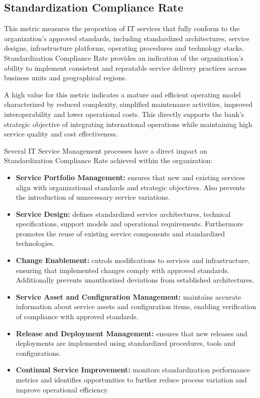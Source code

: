 \subsection{Standardization Compliance Rate}
\label{sub:stdCompliaceRate}

This metric measures the proportion of IT services that fully conform to the organization's approved standards, including standardized architectures, service designs, infrastructure platforms, operating procedures and technology stacks. Standardization Compliance Rate provides an indication of the organization's ability to implement consistent and repeatable service delivery practices across business units and geographical regions.

A high value for this metric indicates a mature and efficient operating model characterized by reduced complexity, simplified maintenance activities, improved interoperability and lower operational costs. This directly supports the bank's strategic objective of integrating international operations while maintaining high service quality and cost effectiveness.

Several IT Service Management processes have a direct impact on Standardization Compliance Rate achieved within the organization:

\begin{itemize}
    \item \textbf{Service Portfolio Management:} ensures that new and existing services align with organizational standards and strategic objectives. Also prevents the introduction of unnecessary service variations.
    \item \textbf{Service Design:} defines standardized service architectures, technical specifications, support models and operational requirements. Furthermore promotes the reuse of existing service components and standardized technologies.
    \item \textbf{Change Enablement:} cntrols modifications to services and infrastructure, ensuring that implemented changes comply with approved standards. Additionally prevents unauthorized deviations from established architectures.
    \item \textbf{Service Asset and Configuration Management:} maintains accurate information about service assets and configuration items, enabling verification of compliance with approved standards.
    \item \textbf{Release and Deployment Management:} ensures that new releases and deployments are implemented using standardized procedures, tools and configurations.
    \item \textbf{Continual Service Improvement:} monitors standardization performance metrics and identifies opportunities to further reduce process variation and improve operational efficiency.
\end{itemize}

